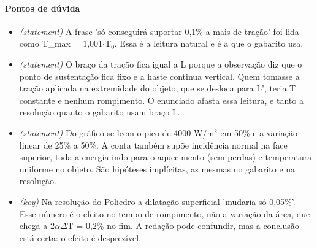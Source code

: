 \documentclass{article}%
\begin{document}
\paragraph{Pontos de dúvida}%
\begin{itemize}%
\item%
\textit{(statement)} A frase 'só conseguirá suportar 0,1\% a mais de tração' foi lida como T\_max = 1,001$\cdot$T$_{0}$. Essa é a leitura natural e é a que o gabarito usa.%
\item%
\textit{(statement)} O braço da tração fica igual a L porque a observação diz que o ponto de sustentação fica fixo e a haste continua vertical. Quem tomasse a tração aplicada na extremidade do objeto, que se desloca para L', teria T constante e nenhum rompimento. O enunciado afasta essa leitura, e tanto a resolução quanto o gabarito usam braço L.%
\item%
\textit{(statement)} Do gráfico se leem o pico de 4000 W/m$^2$ em 50\% e a variação linear de 25\% a 50\%. A conta também supõe incidência normal na face superior, toda a energia indo para o aquecimento (sem perdas) e temperatura uniforme no objeto. São hipóteses implícitas, as mesmas no gabarito e na resolução.%
\item%
\textit{(key)} Na resolução do Poliedro a dilatação superficial 'mudaria só 0,05\%'. Esse número é o efeito no tempo de rompimento, não a variação da área, que chega a 2$\alpha$$\Delta$T = 0,2\% no fim. A redação pode confundir, mas a conclusão está certa: o efeito é desprezível.%
\end{itemize}%
\end{document}
